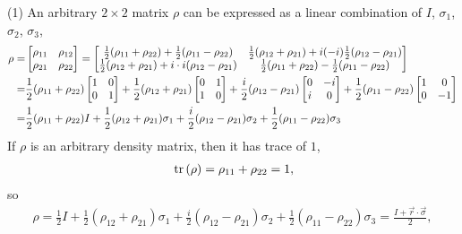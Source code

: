 \documentclass[en]{sol-man}
\begin{document}
\begin{sol}
    \item[(1)] An arbitrary $2\times 2$ matrix $\rho$ can be expressed as a linear combination of $I$, $\sigma_1$, $\sigma_2$, $\sigma_3$,
    \begin{align}
        \notag\rho=&\left[\begin{matrix}
            \rho_{11}&\rho_{12}\\
            \rho_{21}&\rho_{22}
        \end{matrix}\right]=\left[\begin{matrix}
            \frac{1}{2}(\rho_{11}+\rho_{22})+\frac{1}{2}(\rho_{11}-\rho_{22})&\frac{1}{2}(\rho_{12}+\rho_{21})+i(-i)\frac{1}{2}(\rho_{12}-\rho_{21})\\
            \frac{1}{2}(\rho_{12}+\rho_{21})+i\cdot i(\rho_{12}-\rho_{21})&\frac{1}{2}(\rho_{11}+\rho_{22})-\frac{1}{2}(\rho_{11}-\rho_{22})
        \end{matrix}\right]\\
        \notag=&\frac{1}{2}(\rho_{11}+\rho_{22})\left[\begin{matrix}
            1&0\\
            0&1
        \end{matrix}\right]+\frac{1}{2}(\rho_{12}+\rho_{21})\left[\begin{matrix}
            0&1\\
            1&0
        \end{matrix}\right]+\frac{i}{2}(\rho_{12}-\rho_{21})\left[\begin{matrix}
            0&-i\\
            i&0
        \end{matrix}\right]+\frac{1}{2}(\rho_{11}-\rho_{22})\left[\begin{matrix}
            1&0\\
            0&-1
        \end{matrix}\right]\\
        =&\frac{1}{2}(\rho_{11}+\rho_{22})I+\frac{1}{2}(\rho_{12}+\rho_{21})\sigma_1+\frac{i}{2}(\rho_{12}-\rho_{21})\sigma_2+\frac{1}{2}(\rho_{11}-\rho_{22})\sigma_3
    \end{align}
    If $\rho$ is an arbitrary density matrix, then it has trace of $1$,
    \begin{align}
        \,\mathrm{tr}\,(\rho)=\rho_{11}+\rho_{22}=1,
    \end{align}
    so
    \begin{align}
        \rho=\frac{1}{2}I+\frac{1}{2}(\rho_{12}+\rho_{21})\sigma_1+\frac{i}{2}(\rho_{12}-\rho_{21})\sigma_2+\frac{1}{2}(\rho_{11}-\rho_{22})\sigma_3=\frac{I+\vec{r}\cdot\vec{\sigma}}{2},

\end{align}
\end{sol}
\end{document}
